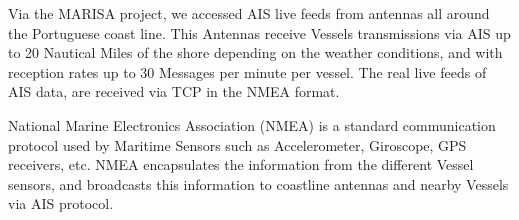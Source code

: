 
Via the MARISA project, we accessed AIS live feeds from antennas all around the Portuguese coast line. This Antennas receive Vessels transmissions via AIS up to 20 Nautical Miles of the shore depending on the weather conditions, and with reception rates up to 30 Messages per minute per vessel. The real live feeds of AIS data, are received via TCP in the NMEA format.

National Marine Electronics Association (NMEA) is a standard communication protocol used by Maritime Sensors such as Accelerometer, Giroscope, GPS receivers, etc.
NMEA encapsulates the information from the different Vessel sensors, and broadcasts this information to coastline antennas and nearby Vessels via AIS protocol.

